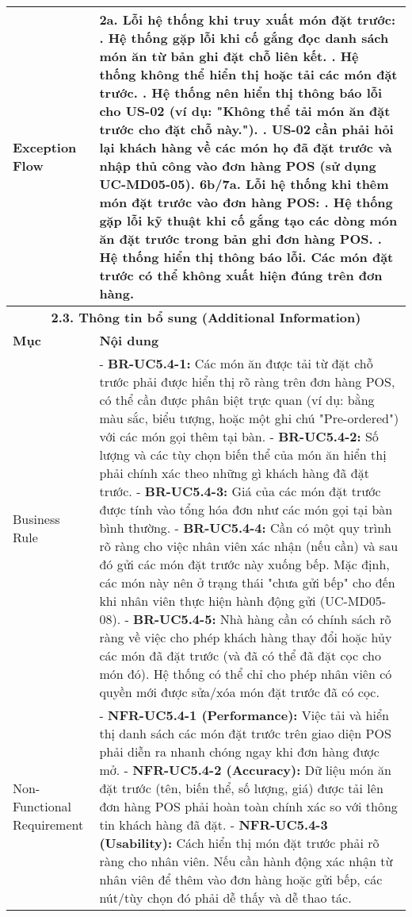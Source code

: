 \begin{longtable}{|m{4cm}|p{11cm}|}
\hline
Exception Flow & \textbf{2a. Lỗi hệ thống khi truy xuất món đặt trước:} \newline    1. Hệ thống gặp lỗi khi cố gắng đọc danh sách món ăn từ bản ghi đặt chỗ liên kết. \newline    2. Hệ thống không thể hiển thị hoặc tải các món đặt trước. \newline    3. Hệ thống nên hiển thị thông báo lỗi cho US-02 (ví dụ: "Không thể tải món ăn đặt trước cho đặt chỗ này."). \newline    4. US-02 cần phải hỏi lại khách hàng về các món họ đã đặt trước và nhập thủ công vào đơn hàng POS (sử dụng UC-MD05-05). \newline \textbf{6b/7a. Lỗi hệ thống khi thêm món đặt trước vào đơn hàng POS:} \newline    1. Hệ thống gặp lỗi kỹ thuật khi cố gắng tạo các dòng món ăn đặt trước trong bản ghi đơn hàng POS. \newline    2. Hệ thống hiển thị thông báo lỗi. Các món đặt trước có thể không xuất hiện đúng trên đơn hàng. \\
\hline
\multicolumn{2}{|c|}{\textbf{2.3. Thông tin bổ sung (Additional Information)}} \\
\hline
\textbf{Mục} & \textbf{Nội dung} \\
\hline
Business Rule & - \textbf{BR-UC5.4-1:} Các món ăn được tải từ đặt chỗ trước phải được hiển thị rõ ràng trên đơn hàng POS, có thể cần được phân biệt trực quan (ví dụ: bằng màu sắc, biểu tượng, hoặc một ghi chú "Pre-ordered") với các món gọi thêm tại bàn. \newline - \textbf{BR-UC5.4-2:} Số lượng và các tùy chọn biến thể của món ăn hiển thị phải chính xác theo những gì khách hàng đã đặt trước. \newline - \textbf{BR-UC5.4-3:} Giá của các món đặt trước được tính vào tổng hóa đơn như các món gọi tại bàn bình thường. \newline - \textbf{BR-UC5.4-4:} Cần có một quy trình rõ ràng cho việc nhân viên xác nhận (nếu cần) và sau đó gửi các món đặt trước này xuống bếp. Mặc định, các món này nên ở trạng thái "chưa gửi bếp" cho đến khi nhân viên thực hiện hành động gửi (UC-MD05-08). \newline - \textbf{BR-UC5.4-5:} Nhà hàng cần có chính sách rõ ràng về việc cho phép khách hàng thay đổi hoặc hủy các món đã đặt trước (và đã có thể đã đặt cọc cho món đó). Hệ thống có thể chỉ cho phép nhân viên có quyền mới được sửa/xóa món đặt trước đã có cọc. \\
\hline
Non-Functional Requirement & - \textbf{NFR-UC5.4-1 (Performance):} Việc tải và hiển thị danh sách các món đặt trước trên giao diện POS phải diễn ra nhanh chóng ngay khi đơn hàng được mở. \newline - \textbf{NFR-UC5.4-2 (Accuracy):} Dữ liệu món ăn đặt trước (tên, biến thể, số lượng, giá) được tải lên đơn hàng POS phải hoàn toàn chính xác so với thông tin khách hàng đã đặt. \newline - \textbf{NFR-UC5.4-3 (Usability):} Cách hiển thị món đặt trước phải rõ ràng cho nhân viên. Nếu cần hành động xác nhận từ nhân viên để thêm vào đơn hàng hoặc gửi bếp, các nút/tùy chọn đó phải dễ thấy và dễ thao tác. \\

\end{longtable}
